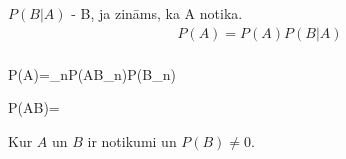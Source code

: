 
{

    $P(B|A)$ - B, ja zināms, ka A notika.
    \begin{align*}
        P(A) = P(A)P(B|A) \\
    \end{align*}
}



{
    \displaystyle P(A)=\sum _{n}P(A\mid B_{n})P(B_{n})
}


{
    \displaystyle P(A\vert B)={}

    Kur $A$ un $B$ ir notikumi un $P(B) \ne 0$. 
}
